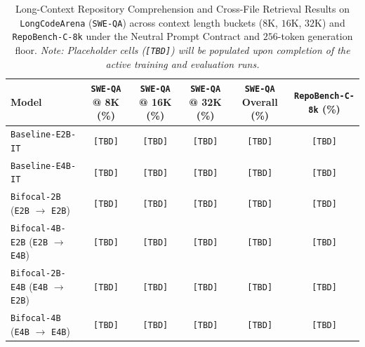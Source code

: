 \begin{table}[t]
\centering
\caption{Long-Context Repository Comprehension and Cross-File Retrieval Results on \texttt{LongCodeArena} (\texttt{SWE-QA}) across context length buckets ($8\text{K}$, $16\text{K}$, $32\text{K}$) and \texttt{RepoBench-C-8k} under the Neutral Prompt Contract and $256$-token generation floor. \textit{Note: Placeholder cells (\texttt{[TBD]}) will be populated upon completion of the active training and evaluation runs.}}
\label{tab:sweqa}
\small
\begin{tabular}{@{}lccccc@{}}
\toprule
\textbf{Model} & \textbf{\texttt{SWE-QA} @ 8K (\%)} & \textbf{\texttt{SWE-QA} @ 16K (\%)} & \textbf{\texttt{SWE-QA} @ 32K (\%)} & \textbf{\texttt{SWE-QA} Overall (\%)} & \textbf{\texttt{RepoBench-C-8k} (\%)} \\
\midrule
\texttt{Baseline-E2B-IT} & \texttt{[TBD]} & \texttt{[TBD]} & \texttt{[TBD]} & \texttt{[TBD]} & \texttt{[TBD]} \\
\texttt{Baseline-E4B-IT} & \texttt{[TBD]} & \texttt{[TBD]} & \texttt{[TBD]} & \texttt{[TBD]} & \texttt{[TBD]} \\
\midrule
\texttt{Bifocal-2B} (\texttt{E2B} $\rightarrow$ \texttt{E2B}) & \texttt{[TBD]} & \texttt{[TBD]} & \texttt{[TBD]} & \texttt{[TBD]} & \texttt{[TBD]} \\
\texttt{Bifocal-4B-E2B} (\texttt{E2B} $\rightarrow$ \texttt{E4B}) & \texttt{[TBD]} & \texttt{[TBD]} & \texttt{[TBD]} & \texttt{[TBD]} & \texttt{[TBD]} \\
\texttt{Bifocal-2B-E4B} (\texttt{E4B} $\rightarrow$ \texttt{E2B}) & \texttt{[TBD]} & \texttt{[TBD]} & \texttt{[TBD]} & \texttt{[TBD]} & \texttt{[TBD]} \\
\texttt{Bifocal-4B} (\texttt{E4B} $\rightarrow$ \texttt{E4B}) & \texttt{[TBD]} & \texttt{[TBD]} & \texttt{[TBD]} & \texttt{[TBD]} & \texttt{[TBD]} \\
\bottomrule
\end{tabular}
\end{table}
